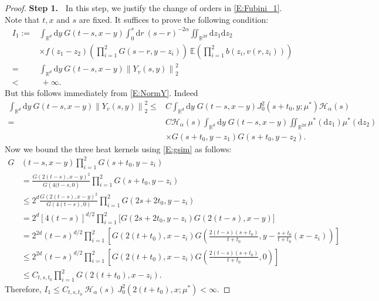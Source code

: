\documentclass[12pt]{report}
\theoremstyle{plain}
\theoremstyle{definition}
\numberwithin{equation}{section}
\newcommand{\R}{\mathbb{R}}
\newcommand{\E}{\mathbb{E}}
\newcommand{\Norm}[1]{\left\|  #1   \right\|}
\newcommand{\ud}{\ensuremath{ \mathrm{d} }}
\begin{document}
\begin{proof}
	{\bf\noindent Step 1.~} In this step, we justify the change of orders in \eqref{E:Fubini_1}. Note
	that $t, x$ and $s$ are fixed. It suffices to prove the following condition:
	\begin{align*}
	I_1:= & \int_{\R^d}\ud y \: G(t-s,x-y) \int_0^s \ud r\: (s-r)^{-2\alpha} \iint_{\R^{2d}} \ud z_1\ud z_2\:               \\
	& \times f(z_1-z_2) \left(  \prod_{i=1}^{2} G(s-r,y-z_i)\right)  \: \E\left(\prod_{i=1}^{2}b(z_i,v(r,z_i))\right) \\
	=  & \int_{\R^d}\ud y \: G(t-s,x-y) \Norm{Y_v(s,y)}_2^2                                                              \\
	<  & \: +\infty.
	\end{align*}
	But this follows immediately from \eqref{E:NormY}. Indeed
	\begin{align*}
	\int_{\R^d}\ud y \: G(t-s,x-y) \Norm{Y_v(s,y)}_2^2
	\le & C \int_{\R^d} \ud y \;  G(t-s,x-y) J_0^2(s+t_0,y;\mu^*) \mathcal{H}_\alpha(s)                       \\
	=  & C \mathcal{H}_\alpha(s) \int_{\R^d} \ud y \;  G(t-s,x-y)\iint_{\R^{2d}}\mu^*(\ud z_1)\mu^*(\ud z_2) \\
	& \times G\left(s+t_0,y-z_1\right)G\left(s+t_0,y-z_2\right).
	\end{align*}
	Now we bound the three heat kernels using \eqref{E:gsim} as follows:
	\begin{align*}
	G & (t-s,x-y)  \prod_{i=1}^{2}G(s+t_0,y- z_i)                                                                                                             \\
	& =\frac{G\left(2(t-s),x-y\right)^2}{G\left(4(t-s,0\right)} \prod_{i=1}^{2}G\left(s+t_0,y- z_i\right)                                                   \\
	& \le 2^d \frac{G\left(2(t-s),x-y\right)^2}{G\left(4(t-s),0\right)} \prod_{i=1}^{2}G\left(2s+2t_0,y- z_i\right)                                         \\
	& = 2^d [4(t-s)]^{d/2} \prod_{i=1}^{2}\bigg[ G\left(2s+2t_0,y- z_i\right)G\left(2(t-s),x-y\right)\bigg]                                                 \\
	& = 2^{2d} (t-s)^{d/2} \prod_{i=1}^{2}\left[G\left(2(t+t_0),x- z_i\right)G\left(\frac{2(t-s)(s+t_0)}{t+t_0},y-\frac{s+t_0}{t+t_0}(x- z_i)\right)\right] \\
	& \le 2^{2d} (t-s)^{d/2} \prod_{i=1}^{2}\left[G\left(2(t+t_0),x- z_i\right)G\left(\frac{2(t-s)(s+t_0)}{t+t_0},0\right)\right]\\
	& \le C_{t,s,t_0} \prod_{i=1}^{2} G\left(2(t+t_0),x- z_i\right).
	\end{align*}
	Therefore, $I_1\le C_{t,s,t_0} \: \mathcal{H}_{\alpha}(s) \: J_0^2\left(2(t+t_0),x;\mu^*\right)
	<\infty$. \bigskip
	

\end{proof}
\end{document}

